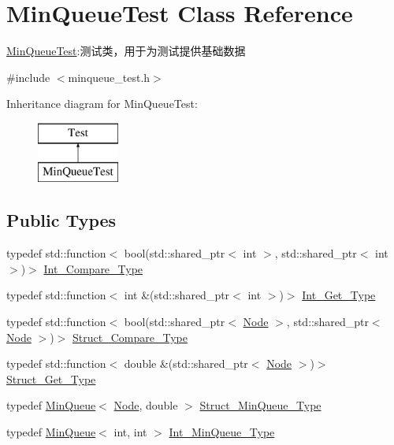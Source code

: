 \hypertarget{class_min_queue_test}{}\section{Min\+Queue\+Test Class Reference}
\label{class_min_queue_test}


\hyperlink{class_min_queue_test}{Min\+Queue\+Test}\+:测试类，用于为测试提供基础数据  




{\ttfamily \#include $<$minqueue\+\_\+test.\+h$>$}

Inheritance diagram for Min\+Queue\+Test\+:\begin{figure}[H]
\begin{center}
\leavevmode
\includegraphics[height=2.000000cm]{class_min_queue_test}
\end{center}
\end{figure}
\subsection*{Public Types}
\begin{DoxyCompactItemize}
\item 
typedef std\+::function$<$ bool(std\+::shared\+\_\+ptr$<$ int $>$, std\+::shared\+\_\+ptr$<$ int $>$)$>$ \hyperlink{class_min_queue_test_a627ceae9e25205d70955137bbfc863fd}{Int\+\_\+\+Compare\+\_\+\+Type}
\item 
typedef std\+::function$<$ int \&(std\+::shared\+\_\+ptr$<$ int $>$)$>$ \hyperlink{class_min_queue_test_a40648c6c5c338387bda62519dc99fc79}{Int\+\_\+\+Get\+\_\+\+Type}
\item 
typedef std\+::function$<$ bool(std\+::shared\+\_\+ptr$<$ \hyperlink{struct_node}{Node} $>$, std\+::shared\+\_\+ptr$<$ \hyperlink{struct_node}{Node} $>$)$>$ \hyperlink{class_min_queue_test_a25bfd5b74968c587db57133f107a5f61}{Struct\+\_\+\+Compare\+\_\+\+Type}
\item 
typedef std\+::function$<$ double \&(std\+::shared\+\_\+ptr$<$ \hyperlink{struct_node}{Node} $>$)$>$ \hyperlink{class_min_queue_test_aebcf6172ed7e9dd6f821fb1043f1cd6f}{Struct\+\_\+\+Get\+\_\+\+Type}
\item 
typedef \hyperlink{class_introduction_to_algorithm_1_1_queue_algorithm_1_1_min_queue}{Min\+Queue}$<$ \hyperlink{struct_node}{Node}, double $>$ \hyperlink{class_min_queue_test_a9b7e5e987d5e856adc5beb6986dd96a3}{Struct\+\_\+\+Min\+Queue\+\_\+\+Type}
\item 
typedef \hyperlink{class_introduction_to_algorithm_1_1_queue_algorithm_1_1_min_queue}{Min\+Queue}$<$ int, int $>$ \hyperlink{class_min_queue_test_ad81df38acc845934accb320c4dbdd582}{Int\+\_\+\+Min\+Queue\+\_\+\+Type}
\end{DoxyCompactItemize}
